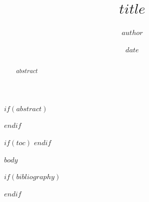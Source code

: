 \documentclass[11pt]{article}
\title{$title$}
\author{$author$}
\date{$date$}
\begin{document}
\maketitle

$if(abstract)$
\begin{abstract}
\noindent $abstract$
\end{abstract}
$endif$

$if(toc)$
\tableofcontents
$endif$

$body$

$if(bibliography)$


$endif$
\end{document}
